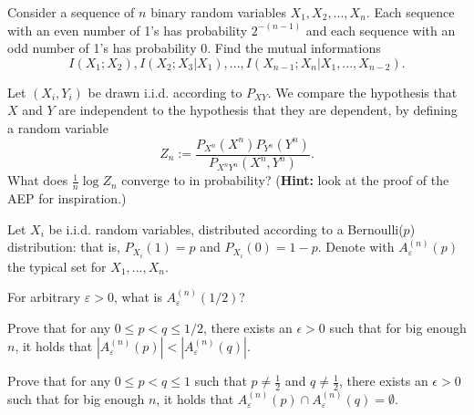 \documentclass[a4paper,10pt,landscape,twocolumn]{scrartcl}
\begin{document}
\begin{exercise}
Consider a sequence of $n$ binary random variables $X_1, X_2, ..., X_n$.
Each sequence with an even number of 1's has probability $2^{-(n-1)}$ and each sequence with an odd number
of 1's has probability 0. Find the mutual informations
\[
I(X_1;X_2), I(X_2;X_3|X_1), ..., I(X_{n-1};X_n|X_1, ..., X_{n-2}).
\]
\end{exercise}
\vspace{-0.5cm}

\begin{exercise}[Independence?]
	Let $(X_i,Y_i)$ be drawn i.i.d. according to $P_{XY}$. We compare the hypothesis that $X$ and $Y$ are independent to the hypothesis that they are dependent, by defining a random variable
	\[
	Z_n := \frac{P_{X^n}({X^n})P_{Y^n}(Y^n)}{P_{X^nY^n}(X^n,Y^n)}.
	\]
	What does $\frac{1}{n} \log Z_n$ converge to in probability? (\textbf{Hint:} look at the proof of the AEP for inspiration.)
\end{exercise}

\begin{exercise}
	Let $X_i$ be i.i.d. random variables, distributed according to a Bernoulli($p$) distribution: that is, $P_{X_i}(1) = p$ and $P_{X_i}(0) = 1-p$. Denote with $A_{\varepsilon}^{(n)}(p)$ the typical set for $X_1, ..., X_n$.
	
	\begin{subex}
		For arbitrary $\varepsilon > 0$, what is $A_{\varepsilon}^{(n)}(1/2)$?
	\end{subex}
	\begin{subex}
		Prove that for any $0 \leq p < q \leq 1/2$, there exists
                an $\epsilon > 0$ such that for big enough $n$, it holds that $|A_{\varepsilon}^{(n)}(p)| < |A_{\varepsilon}^{(n)}(q)|$.
	\end{subex}
\begin{subex**}
	Prove that for any $0\leq p < q \leq 1$ such that $p \neq \frac12$ and
        $q \neq \frac12$, there exists an $\epsilon > 0$ such that for big enough $n$, it holds that $A_{\varepsilon}^{(n)}(p) \cap A_{\varepsilon}^{(n)}(q) = \emptyset$.
\end{subex**}
\end{exercise}
\end{document}
